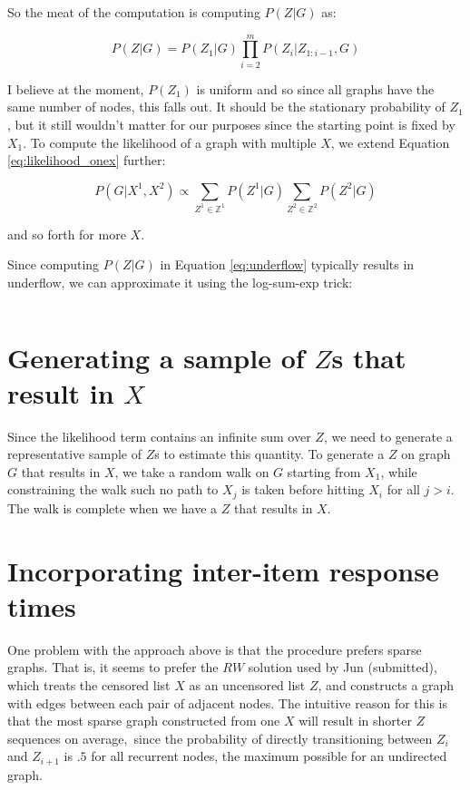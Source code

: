 \documentclass{article}
\begin{document}
\vspace{5mm}

So the meat of the computation is computing $P(Z|G)$ as:

\begin{equation}
    \label{eq:underflow}
    P(Z|G)=P(Z_1|G)\prod_{i=2}^{m} P(Z_{i}|Z_{1:i-1},G)
\end{equation}

I believe at the moment, $P(Z_1)$ is uniform and so since all graphs have the
same number of nodes, this falls out. It should be the stationary probability
of $Z_1$, but it still wouldn't matter for our purposes since the starting
point is fixed by $X_1$. To compute the likelihood of a graph with multiple
$X$, we extend Equation \ref{eq:likelihood_onex} further:

\begin{equation}
    P(G|X^1,X^2) \propto \sum_{Z^1 \in \mathbb{Z}^1} P(Z^1|G) \sum_{Z^2 \in \mathbb{Z}^2} P(Z^2|G)
\end{equation}

and so forth for more $X$.

\vspace{5mm}

Since computing $P(Z|G)$ in Equation \ref{eq:underflow} typically results in
underflow, we can approximate it using the log-sum-exp trick:

\begin{equation}
\end{equation}

\section{Generating a sample of $Z$s that result in $X$}

Since the likelihood term contains an infinite sum over $Z$, we need to
generate a representative sample of $Z$s to estimate this quantity. To generate
a $Z$ on graph $G$ that results in $X$, we take a random walk on $G$ starting
from $X_1$, while constraining the walk such no path to $X_j$ is taken before
hitting $X_i$ for all $j>i$. The walk is complete when we have a $Z$ that
results in $X$.

\section{Incorporating inter-item response times}

One problem with the approach above is that the procedure prefers sparse
graphs. That is, it seems to prefer the $RW$ solution used by Jun (submitted),
which treats the censored list $X$ as an uncensored list $Z$, and constructs a
graph with edges between each pair of adjacent nodes. The intuitive reason for
this is that the most sparse graph constructed from one $X$ will result in
shorter $Z$ sequences on average, since the probability of directly
transitioning between $Z_i$ and $Z_{i+1}$ is $.5$ for all recurrent nodes, the
maximum possible for an undirected graph.
\end{document}
